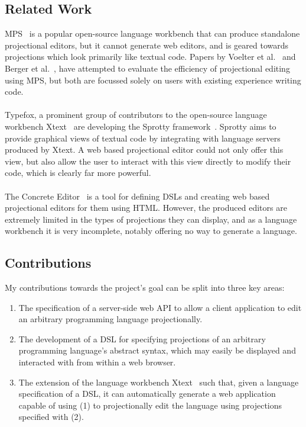 \documentclass{article}
\begin{document}
\subsection{Related Work}
MPS~\cite{mps} is a popular open-source language workbench that can produce standalone projectional editors, but it cannot generate web editors, and is geared towards projections which look primarily like textual code. Papers by Voelter et al.~\cite{towardsUserFriendlyProjEditors} and Berger et al.~\cite{projEditControlledExperiment}, have attempted to evaluate the efficiency of projectional editing using MPS, but both are focussed solely on users with existing experience writing code.  
\\
\\
Typefox, a prominent group of contributors to the open-source language workbench Xtext~\cite{xtext} are developing the Sprotty framework~\cite{sprotty}. Sprotty aims to provide graphical views of textual code by integrating with language servers produced by Xtext. A web based projectional editor could not only offer this view, but also allow the user to interact with this view directly to modify their code, which is clearly far more powerful.
\\
\\
The Concrete Editor~\cite{concrete} is a tool for defining DSLs and creating web based projectional editors for them using HTML. However, the produced editors are extremely limited in the types of projections they can display, and as a language workbench it is very incomplete, notably offering no way to generate a language.

\subsection{Contributions}

My contributions towards the project's goal can be split into three key areas:

\begin{enumerate}
\item The specification of a server-side web API to allow a client application to edit an arbitrary programming language projectionally.
\item The development of a DSL for specifying projections of an arbitrary programming language's abstract syntax, which may easily be displayed and interacted with from within a web browser.
\item The extension of the language workbench Xtext~\cite{xtext} such that, given a language specification of a DSL, it can automatically generate a web application capable of using (1) to projectionally edit the language using projections specified with (2).
\end{enumerate}
\end{document}
